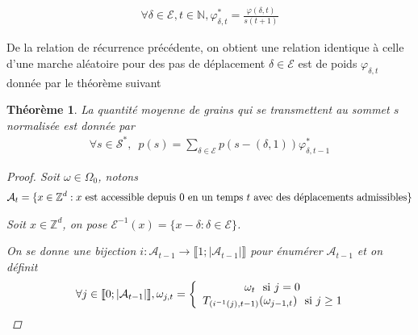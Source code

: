 \documentclass{article}
\newtheorem{theorem}{Théorème}[section]
\begin{document}
\begin{align*}
	\forall \delta\in\mathcal{E}, t\in\mathbb{N}, \varphi^*_{\delta,t} = \frac{\varphi(\delta,t)}{s(t+1)}
\end{align*}


De la relation de récurrence précédente, on obtient une relation identique à celle d'une marche aléatoire pour des pas de déplacement $\delta \in \mathcal{E}$ est de poids $\varphi_{\delta, t}$ donnée par le théorème suivant
\begin{theorem}

	La quantité moyenne de grains qui se transmettent au sommet $s$ normalisée est donnée par
	\begin{align*}
	\forall s\in\mathcal{S}^*,\,\,\, p(s) = \sum_{\delta\in \mathcal{E}}p(s-(\delta,1))\varphi^*_{\delta,t-1}\end{align*} 
	\begin{proof}
		Soit $\omega \in\Omega_0$, notons \begin{align*}
		\mathcal{A}_t = \{x \in \mathbb{Z}^d : x \textup{ est accessible depuis } 0 \textup{ en un temps } t \textup{ avec des déplacements admissibles}\}\end{align*}
		
		Soit $x\in\mathbb{Z}^d$, on pose $\mathcal{E}^{-1}(x) = \{x-\delta : \delta\in\mathcal{E}\}$.

		On se donne une bijection $i : \mathcal{A}_{t-1} \to \llbracket 1;|\mathcal{A}_{t-1}|\rrbracket$ pour énumérer $\mathcal{A}_{t-1}$ et on définit
		\begin{align*}\forall j\in\llbracket 0;|\mathcal{A}_{t-1}|\rrbracket, \omega_{j,t} = 
			\left \{
\begin{array}{c @{} c}
	\omega_{t} \,\,\,\, \textup{si }j=0 \\
	T_{(i^{-1}(j),t-1)}(\omega_{j-1,t}) \,\,\,\, \textup{si }j\geq 1\\
\end{array}
\right.\end{align*}


\end{proof}
\end{theorem}
\end{document}
